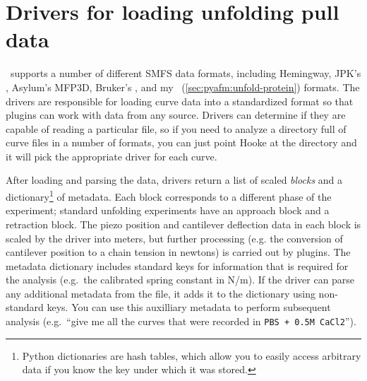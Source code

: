 \section{Drivers for loading unfolding pull data}
\label{sec:hooke:drivers}

\Hooke\ supports a number of different SMFS data formats, including
Hemingway\citep{materassi09}, JPK's , Asylum's
MFP3D\citep{mfp-3d}, Bruker's , and my
\unfoldprotein\ (\cref{sec:pyafm:unfold-protein}) formats.  The
drivers are responsible for loading curve data into a standardized
format so that plugins can work with data from any source.  Drivers
can determine if they are capable of reading a particular file, so if
you need to analyze a directory full of curve files in a number of
formats, you can just point Hooke at the directory and it will pick
the appropriate driver for each curve.

After loading and parsing the data, drivers return a list of scaled
\emph{blocks} and a dictionary\footnote{
  Python dictionaries are hash tables, which allow you to easily
  access arbitrary data if you know the key under which it was stored.
} of metadata.  Each block corresponds to a different phase of the
experiment; standard unfolding experiments have an approach block and
a retraction block.  The piezo position and cantilever deflection data
in each block is scaled by the driver into meters, but further
processing (e.g. the conversion of cantilever position to a chain
tension in newtons) is carried out by plugins.  The metadata
dictionary includes standard keys for information that is required for
the analysis (e.g.~the calibrated spring constant in N/m).  If the
driver can parse any additional metadata from the file, it adds it to
the dictionary using non-standard keys.  You can use this auxilliary
metadata to perform subsequent analysis (e.g.~``give me all the curves
that were recorded in \texttt{PBS + 0.5M CaCl2}'').
